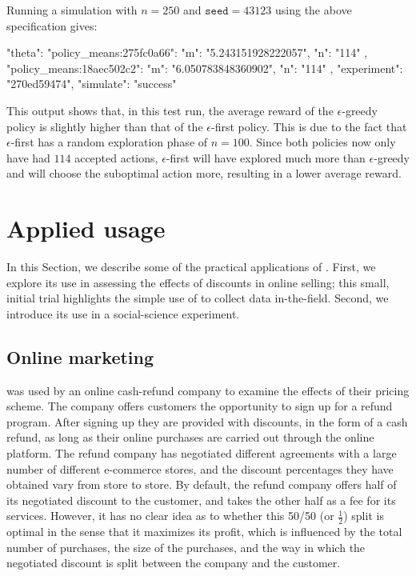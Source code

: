 \documentclass[nojss]{jss}
\begin{document}
Running a simulation with $n=250$ and $\texttt{seed}=43123$ using the above specification gives:
\begin{Code}
{
    "theta": {
        "policy_means:275fc0a66": {
            "m": "5.243151928222057",
            "n": "114"
        },
        "policy_means:18aec502c2": {
            "m": "6.050783848360902",
            "n": "114"
        }
    },
    "experiment": "270ed59474",
    "simulate": "success"
}
\end{Code}
This output shows that, in this test run, the average reward of the $\epsilon$-greedy policy is slightly higher than that of the $\epsilon$-first policy. This is due to the fact that $\epsilon$-first has a random exploration phase of $n = 100$. Since both policies now only have had $114$ accepted actions, $\epsilon$-first will have explored much more than $\epsilon$-greedy and will choose the suboptimal action more, resulting in a lower average reward.



\section{Applied usage}
\label{sec:practice}

In this Section, we describe some of the practical applications of . First, we explore its use in assessing the effects of discounts in online selling; this small, initial trial highlights the simple use of  to collect data in-the-field. Second, we introduce its use in a social-science experiment.

\subsection{Online marketing}

 was used by an online cash-refund company to examine the effects of their pricing scheme. The company offers customers the opportunity to sign up for a refund program. After signing up they are provided with discounts, in the form of a cash refund, as long as their online purchases are carried out through the online platform. The refund company has negotiated different agreements with a large number of different e-commerce stores, and the discount percentages they have obtained vary from store to store. By default, the refund company offers half of its negotiated discount to the customer, and takes the other half as a fee for its services. However, it has no clear idea as to whether this 50/50 (or $\frac{1}{2}$) split is optimal in the sense that it maximizes its profit, which is influenced by the total number of purchases, the size of the purchases, and the way in which the negotiated discount is split between the company and the customer.
\end{document}
